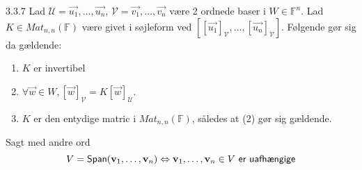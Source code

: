 \begin{proposition}{3.3.7}
	Lad $\mathcal{U} = {\vec{u_1}, \ldots, \vec{u_n}}$, $\mathcal{V} = {
	\vec{v_1}, \ldots, \vec{v_n}}$ 
	være 2 ordnede baser i $W \in \mathbb{F}^n$. 
	Lad $K \in Mat_{n,n}(\mathbb{F})$ være givet i søjleform ved $[[
	\vec{u_1}]_{\mathcal{V}}, \ldots, [\vec{u_n}]_{\mathcal{V}}]$.
	Følgende gør sig da gældende:
	\begin{enumerate}
		\item $K$ er invertibel
		\item $\forall \vec{w} \in W, [\vec{w}]_{\mathcal{V}} = 
			K[\vec{w}]_{\mathcal{U}}$.
		\item $K$ er den entydige matric i $Mat_{n,n}(\mathbb{F})$, således at
			(2) gør sig gældende.
	\end{enumerate}
	Sagt med andre ord
	\[
		V = \textsf{Span}(\mathbf{v}_1, \dotsc, \mathbf{v}_n) \Leftrightarrow \mathbf{v}_1, \dotsc, \mathbf{v}_n \in V \textsf{
		er uafhængige}
	\]
\end{proposition}

